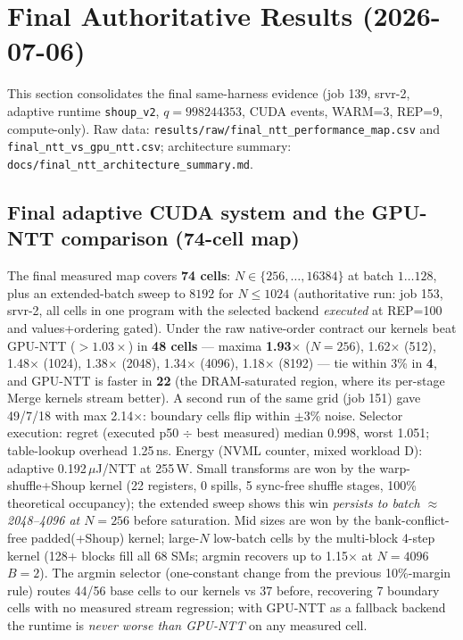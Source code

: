 \documentclass[11pt,a4paper]{article}
\begin{document}
\section{Final Authoritative Results (2026-07-06)}

This section consolidates the final same-harness evidence (job 139, srvr-2, adaptive runtime
\texttt{shoup\_v2}, $q=998244353$, CUDA events, WARM=3, REP=9, compute-only). Raw data:
\texttt{results/raw/final\_ntt\_performance\_map.csv} and \texttt{final\_ntt\_vs\_gpu\_ntt.csv};
architecture summary: \texttt{docs/final\_ntt\_architecture\_summary.md}.

\subsection{Final adaptive CUDA system and the GPU-NTT comparison (74-cell map)}
The final measured map covers \textbf{74 cells}: $N\in\{256,\dots,16384\}$ at batch $1\dots128$,
plus an extended-batch sweep to $8192$ for $N\le1024$ (authoritative run: job 153, srvr-2, all cells in
one program with the selected backend \emph{executed} at REP=100 and values+ordering gated). Under the
raw native-order contract our kernels beat GPU-NTT (${>}1.03\times$) in \textbf{48 cells} --- maxima
\textbf{1.93$\times$} ($N{=}256$), 1.62$\times$ (512), 1.48$\times$ (1024), 1.38$\times$ (2048),
1.34$\times$ (4096), 1.18$\times$ (8192) --- tie within 3\% in \textbf{4}, and GPU-NTT is faster in
\textbf{22} (the DRAM-saturated region, where its per-stage Merge kernels stream better). A second run
of the same grid (job 151) gave 49/7/18 with max 2.14$\times$: boundary cells flip within $\pm$3\%
noise. Selector execution: regret (executed p50 $\div$ best measured) median 0.998, worst 1.051;
table-lookup overhead 1.25\,ns. Energy (NVML counter, mixed workload D): adaptive 0.192\,$\mu$J/NTT
at 255\,W.
Small transforms are won by the warp-shuffle+Shoup kernel (22 registers, 0 spills, 5 sync-free
shuffle stages, 100\% theoretical occupancy); the extended sweep shows this win \emph{persists to
batch $\approx$2048--4096 at $N{=}256$} before saturation. Mid sizes are won by the bank-conflict-free
padded(+Shoup) kernel; large-$N$ low-batch cells by the multi-block 4-step kernel (128+ blocks fill
all 68 SMs; argmin recovers up to 1.15$\times$ at $N{=}4096$ $B{=}2$). The argmin selector
(one-constant change from the previous 10\%-margin rule) routes 44/56 base cells to our kernels vs
37 before, recovering 7 boundary cells with no measured stream regression; with GPU-NTT as a fallback
backend the runtime is \emph{never worse than GPU-NTT} on any measured cell.
\end{document}
